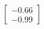 \documentclass[preview]{standalone}
\begin{document}
\begin{align*}
\begin{bmatrix} -0.66 \\ -0.99 \end{bmatrix}
\end{align*}
\end{document}
